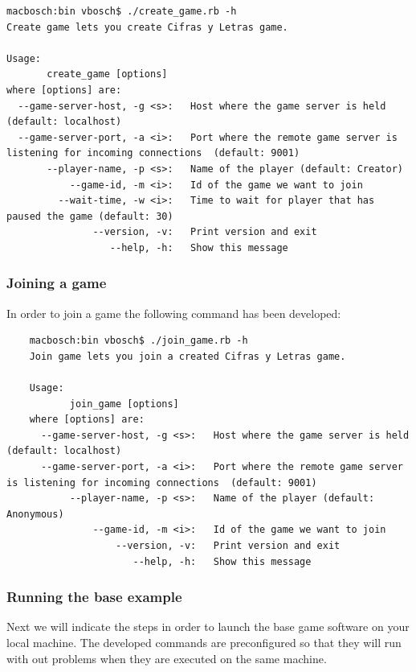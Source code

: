\documentclass[a4paper,10pt,titlepage]{article}
\begin{document}
{\footnotesize\begin{verbatim}
macbosch:bin vbosch$ ./create_game.rb -h
Create game lets you create Cifras y Letras game.

Usage:
       create_game [options]
where [options] are:
  --game-server-host, -g <s>:   Host where the game server is held (default: localhost)
  --game-server-port, -a <i>:   Port where the remote game server is listening for incoming connections  (default: 9001)
       --player-name, -p <s>:   Name of the player (default: Creator)
           --game-id, -m <i>:   Id of the game we want to join
         --wait-time, -w <i>:   Time to wait for player that has paused the game (default: 30)
               --version, -v:   Print version and exit
                  --help, -h:   Show this message
\end{verbatim}}

\subsubsection{Joining a game}

\par In order to join a game the following command has been developed:

{\footnotesize\begin{verbatim}
	macbosch:bin vbosch$ ./join_game.rb -h
	Join game lets you join a created Cifras y Letras game.

	Usage:
	       join_game [options]
	where [options] are:
	  --game-server-host, -g <s>:   Host where the game server is held (default: localhost)
	  --game-server-port, -a <i>:   Port where the remote game server is listening for incoming connections  (default: 9001)
	       --player-name, -p <s>:   Name of the player (default: Anonymous)
	           --game-id, -m <i>:   Id of the game we want to join
	               --version, -v:   Print version and exit
	                  --help, -h:   Show this message
\end{verbatim}}

\subsubsection{Running the base example}

\par Next we will indicate the steps in order to launch the base game software on your local machine. The developed commands are preconfigured so that they will run with out problems when they are executed on the same machine.
\end{document}

